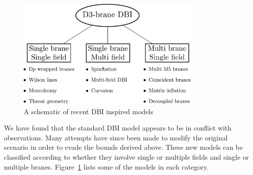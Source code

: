 \label{sec:others-dbi}
\begin{figure}[htbp]
 \centering
 \includegraphics[width=0.8\textwidth]{./dbi/graphs/dbi-review.pdf}
 \caption[Recent DBI Inspired Models]{A schematic of recent DBI inspired models}
 \label{fig:review-dbi}
\end{figure}
% 

We have found that the standard DBI model appears to be in conflict with
observations. Many attempts have since been made to modify the original scenario in
order to evade the bounds derived above. These new models can be classified according
to
whether they involve single or multiple fields and single or multiple branes.
Figure~\ref{fig:review-dbi} lists some of the models in
each category.


